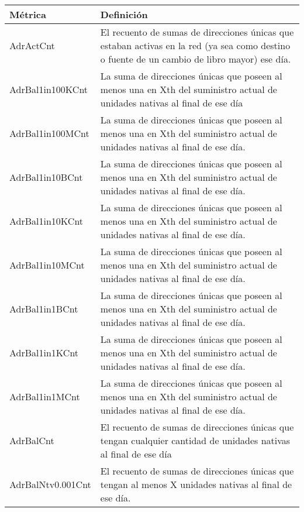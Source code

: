 \newpage
\begin{table}[h!]
	\begin{tabular}{|l|m{12cm}|}
		\hline
		\textbf{Métrica}&\textbf{Definición}\\
		\hline
		AdrActCnt         & El recuento de sumas de direcciones únicas que estaban activas en la red (ya sea como destino o fuente de un cambio de libro mayor) ese día. \\
		\hline
		AdrBal1in100KCnt  & La suma de direcciones únicas que poseen al menos una en Xth del suministro actual de unidades nativas al final de ese día                   \\
		\hline
		AdrBal1in100MCnt  & La suma de direcciones únicas que poseen al menos una en Xth del suministro actual de unidades nativas al final de ese día.                  \\
		\hline
		AdrBal1in10BCnt   & La suma de direcciones únicas que poseen al menos una en Xth del suministro actual de unidades nativas al final de ese día.                  \\
		\hline
		AdrBal1in10KCnt   & La suma de direcciones únicas que poseen al menos una en Xth del suministro actual de unidades nativas al final de ese día.                  \\
		\hline
		AdrBal1in10MCnt   & La suma de direcciones únicas que poseen al menos una en Xth del suministro actual de unidades nativas al final de ese día.                  \\
		\hline
		AdrBal1in1BCnt    & La suma de direcciones únicas que poseen al menos una en Xth del suministro actual de unidades nativas al final de ese día.                  \\
		\hline
		AdrBal1in1KCnt    & La suma de direcciones únicas que poseen al menos una en Xth del suministro actual de unidades nativas al final de ese día.                  \\
		\hline
		AdrBal1in1MCnt    & La suma de direcciones únicas que poseen al menos una en Xth del suministro actual de unidades nativas al final de ese día.                  \\
		\hline
		AdrBalCnt         & El recuento de sumas de direcciones únicas que tengan cualquier cantidad de unidades nativas al final de ese día                             \\
		\hline
		AdrBalNtv0.001Cnt & El recuento de sumas de direcciones únicas que tengan al menos X unidades nativas al final de ese día.                                       \\
		\hline

\end{tabular}
\end{table}
